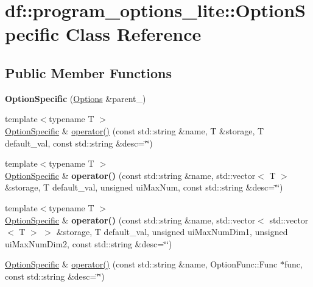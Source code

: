 \hypertarget{classdf_1_1program__options__lite_1_1_option_specific}{}\section{df\+:\+:program\+\_\+options\+\_\+lite\+:\+:Option\+Specific Class Reference}
\label{classdf_1_1program__options__lite_1_1_option_specific}
\subsection*{Public Member Functions}
\begin{DoxyCompactItemize}
\item 
\mbox{\label{classdf_1_1program__options__lite_1_1_option_specific_a77c7c1f10b614b9eecc9e91f8e9a9f1f}} 
{\bfseries Option\+Specific} (\hyperlink{structdf_1_1program__options__lite_1_1_options}{Options} \&parent\+\_\+)
\item 
{\footnotesize template$<$typename T $>$ }\\\hyperlink{classdf_1_1program__options__lite_1_1_option_specific}{Option\+Specific} \& \hyperlink{classdf_1_1program__options__lite_1_1_option_specific_acea9355e21c8508c877d026b0607dc43}{operator()} (const std\+::string \&name, T \&storage, T default\+\_\+val, const std\+::string \&desc=\char`\"{}\char`\"{})
\item 
\mbox{\label{classdf_1_1program__options__lite_1_1_option_specific_a8c281b88ceafb34f0e857403f3be0190}} 
{\footnotesize template$<$typename T $>$ }\\\hyperlink{classdf_1_1program__options__lite_1_1_option_specific}{Option\+Specific} \& {\bfseries operator()} (const std\+::string \&name, std\+::vector$<$ T $>$ \&storage, T default\+\_\+val, unsigned ui\+Max\+Num, const std\+::string \&desc=\char`\"{}\char`\"{})
\item 
\mbox{\label{classdf_1_1program__options__lite_1_1_option_specific_a10273a65b1a657e814906ba3629f4e46}} 
{\footnotesize template$<$typename T $>$ }\\\hyperlink{classdf_1_1program__options__lite_1_1_option_specific}{Option\+Specific} \& {\bfseries operator()} (const std\+::string \&name, std\+::vector$<$ std\+::vector$<$ T $>$ $>$ \&storage, T default\+\_\+val, unsigned ui\+Max\+Num\+Dim1, unsigned ui\+Max\+Num\+Dim2, const std\+::string \&desc=\char`\"{}\char`\"{})
\item 
\hyperlink{classdf_1_1program__options__lite_1_1_option_specific}{Option\+Specific} \& \hyperlink{classdf_1_1program__options__lite_1_1_option_specific_a757b17855cd89bc536c51f5c7e716d83}{operator()} (const std\+::string \&name, Option\+Func\+::\+Func $\ast$func, const std\+::string \&desc=\char`\"{}\char`\"{})
\end{DoxyCompactItemize}


